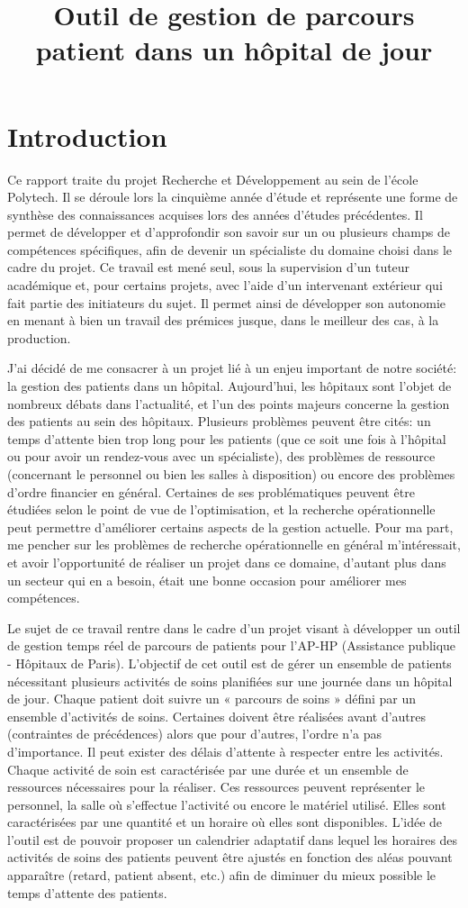 \documentclass{polytech/polytech}
\title{Outil de gestion de parcours patient dans un hôpital de jour}
\begin{document}
\chapter*{Introduction}

Ce rapport traite du projet Recherche et Développement au sein de l'école Polytech. Il se déroule lors la cinquième année d'étude et représente une forme de synthèse des connaissances acquises lors des années d’études précédentes. Il permet de développer et d’approfondir son savoir sur un ou plusieurs champs de compétences spécifiques, afin de devenir un spécialiste du domaine choisi dans le cadre du projet. Ce travail est mené seul, sous la supervision d'un tuteur académique et, pour certains projets, avec l’aide d’un intervenant extérieur qui fait partie des initiateurs du sujet. Il permet ainsi de développer son autonomie en menant à bien un travail des prémices jusque, dans le meilleur des cas, à la production.

J'ai décidé de me consacrer à un projet lié à un enjeu important de notre société: la gestion des patients dans un hôpital. Aujourd'hui, les hôpitaux sont l'objet de nombreux débats dans l'actualité, et l'un des points majeurs concerne la gestion des patients au sein des hôpitaux. Plusieurs problèmes peuvent être cités: un temps d'attente bien trop long pour les patients (que ce soit une fois à l'hôpital ou pour avoir un rendez-vous avec un spécialiste), des problèmes de ressource (concernant le personnel ou bien les salles à disposition) ou encore des problèmes d'ordre financier en général. Certaines de ses problématiques peuvent être étudiées selon le point de vue de l'optimisation, et la recherche opérationnelle peut permettre d'améliorer certains aspects de la gestion actuelle. Pour ma part, me pencher sur les problèmes de recherche opérationnelle en général m'intéressait, et avoir l'opportunité de réaliser un projet dans ce domaine, d'autant plus dans un secteur qui en a besoin, était une bonne occasion pour améliorer mes compétences.

Le sujet de ce travail rentre dans le cadre d’un projet visant à développer un outil de gestion temps réel de parcours de patients pour l’AP-HP (Assistance publique - Hôpitaux de Paris). L'objectif de cet outil est de gérer un ensemble de patients nécessitant plusieurs activités de soins planifiées sur une journée dans un hôpital de jour. Chaque patient doit suivre un « parcours de soins » défini par un ensemble d’activités de soins. Certaines doivent être réalisées avant d'autres (contraintes de précédences) alors que pour d'autres, l’ordre n’a pas d’importance. Il peut exister des délais d'attente à respecter entre les activités. Chaque activité de soin est caractérisée par une durée et un ensemble de ressources nécessaires pour la réaliser. Ces ressources peuvent représenter le personnel, la salle où s'effectue l'activité ou encore le matériel utilisé. Elles sont caractérisées par une quantité et un horaire où elles sont disponibles. L'idée de l'outil est de pouvoir proposer un calendrier adaptatif dans lequel les horaires des activités de soins des patients peuvent être ajustés en fonction des aléas pouvant apparaître (retard, patient absent, etc.) afin de diminuer du mieux possible le temps d'attente des patients.
\end{document}
